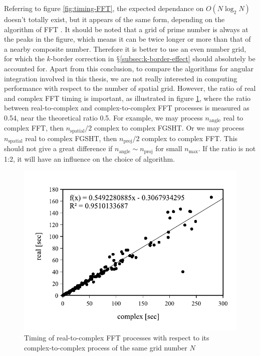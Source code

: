 Referring to figure \ref{fig:timing-FFT}, the expected dependance
on $O(N\log_{2}N)$ \citep{Numerical_Recipes_3ed} doesn't totally
exist, but it appears of the same form, depending on the algorithm
of \acs{FFT} \citep{Briggs-DFT}. It should be noted that a grid
of prime number is always at the peaks in the figure, which means
it can be twice longer or more than that of a nearby composite number.
Therefore it is better to use an even number grid, for which the $k$-border
correction in $\mathsection$\ref{subsec:k-border-effect} should
absolutely be accounted for. Apart from this conclusion, to compare
the algorithms for angular integration involved in this thesis, we
are not really interested in computing performance with respect to
the number of spatial grid. However, the ratio of real and complex
\acs{FFT} timing is important, as illustrated in figure \ref{fig:fft-real-to-complex},
where the ratio between real-to-complex and complex-to-complex \acs{FFT}
processes is measured as 0.54, near the theoretical ratio 0.5. For
example, we may process $n_{\mathrm{angle}}$ real to complex \acs{FFT},
then $n_{\mathrm{spatial}}/2$ complex to complex \acs{FGSHT}. Or
we may process $n_{\mathrm{spatial}}$ real to complex \acs{FGSHT},
then $n_{\mathrm{proj}}/2$ complex to complex \acs{FFT}. This should
not give a great difference if $n_{\mathrm{angle}}\sim n_{\mathrm{proj}}$
for small $n_{\max}$. If the ratio is not 1:2, it will have an influence
on the choice of algorithm.
\begin{center}
\begin{figure}[h]
\begin{centering}
\includegraphics[bb=0bp 20bp 340bp 235bp,width=0.5\columnwidth]{_figure/results/fftw_real_v_cmplx}
\par\end{centering}
\caption{Timing of real-to-complex \acs{FFT} processes with respect to its
complex-to-complex process of the same grid number $N$\label{fig:fft-real-to-complex}}
\end{figure}
\par\end{center}

